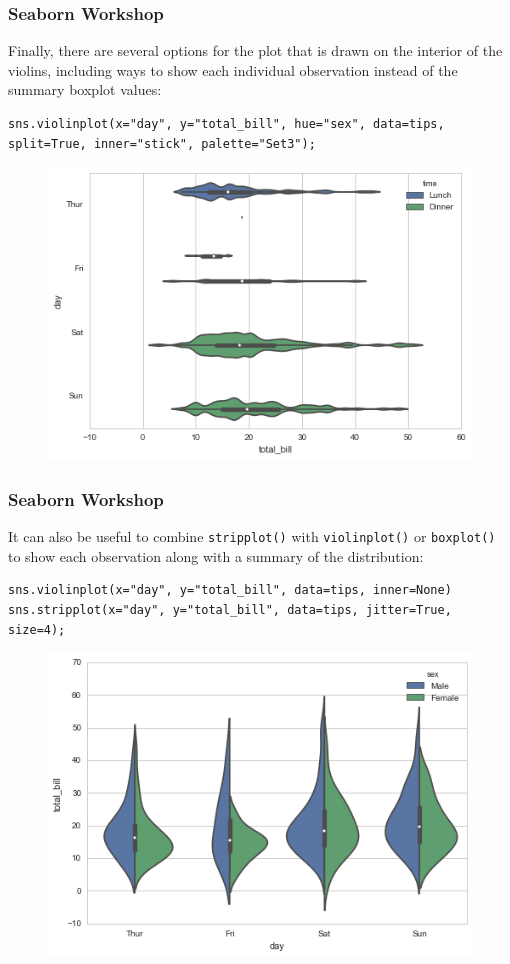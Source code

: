 \documentclass{beamer}
\begin{document}
\begin{frame}[fragile]
	\frametitle{Seaborn Workshop}
Finally, there are several options for the plot that is drawn on the interior of the violins, including ways to show each individual observation instead of the summary boxplot values:
\begin{verbatim}
sns.violinplot(x="day", y="total_bill", hue="sex", data=tips,
split=True, inner="stick", palette="Set3");
\end{verbatim}

\begin{figure}
	\centering
	\includegraphics[width=0.7\linewidth]{images/categorical_25_0}
\end{figure}
\end{frame}
\begin{frame}[fragile]
	\frametitle{Seaborn Workshop}
It can also be useful to combine \texttt{stripplot()} with \texttt{violinplot()} or \texttt{boxplot()} to show each observation along with a summary of the distribution:
\begin{verbatim}
sns.violinplot(x="day", y="total_bill", data=tips, inner=None)
sns.stripplot(x="day", y="total_bill", data=tips, jitter=True, size=4);
\end{verbatim}
\begin{figure}
\centering
\includegraphics[width=0.7\linewidth]{images/categorical_27_0}
\end{figure}
\end{frame}
\end{document}
